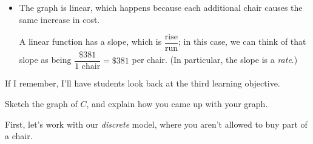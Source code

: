 \documentclass{article}
\begin{document}
\begin{enumerate}
\begin{enumerate}[start=3]
{\begin{itemize}
      \item The graph is linear, which happens because each additional chair causes the same increase in cost.

        A linear function has a slope, which is $\dfrac{\text{rise}}{\text{run}}$; in this case, we can think of that slope as being $\dfrac{\$381}{\text{1 chair}} = \$381$ per chair. (In particular, the slope is a \emph{rate}.)

      \end{itemize}
      If I remember, I'll have students look back at the third learning objective. 
    } 

    \begin{problem}[\vfill\newpage]
      Sketch the graph of $C$, and explain how you came up with your graph.
    \end{problem}

    \begin{solution}
      First, let's work with our \emph{discrete} model, where you aren't allowed to buy part of a chair.


\end{solution}
\end{enumerate}
\end{enumerate}
\end{document}
